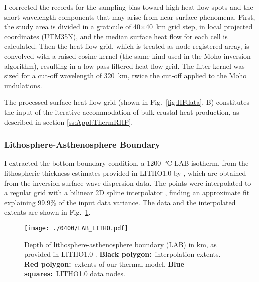 I corrected the records for the sampling bias toward high heat flow spots \parencite{Mareschal2013} and the short-wavelength components that may arise from near-surface phenomena.
First, the study area is divided in a graticule of \num{40}$\times$\SI{40}{\kilo \metre} grid step, in local projected coordinates (UTM35N), and the median surface heat flow for each cell is calculated.
Then the heat flow grid, which is treated as node-registered array, is convolved with a raised cosine kernel (the same kind used in the Moho inversion algorithm), resulting in a low-pass filtered heat flow grid.
The filter kernel was sized for a cut-off wavelength of \SI{320}{\kilo \metre}, twice the cut-off applied to the Moho undulations.

The processed surface heat flow grid (shown in Fig.~\ref{fig:HFdata}, B) constitutes the input of the iterative accommodation of bulk crustal heat production, as described in section \ref{ss:Appl:ThermRHP}.

\subsubsection{Lithosphere-Asthenosphere Boundary}
\label{sss:Appl:ThermInputLAB}

I extracted the bottom boundary condition, a \SI{1200}{\celsius} LAB-isotherm, from the lithospheric thickness estimates provided in LITHO1.0 by \textcite{Pasyanos2014}, which are obtained from the inversion surface wave dispersion data.
The points were interpolated to a regular grid with a bilinear 2D spline interpolator \parencite{Wessel2009}, finding an approximate fit explaining 99.9\% of the input data variance.
The data and the interpolated extents are shown in Fig.~\ref{fig:LAB}.

\begin{figure}
	\begin{adjustbox}{center}
	\texttt{[image: ./0400/LAB\_LITHO.pdf]}
	\end{adjustbox}
	\caption[Depth of lithosphere-asthenosphere boundary (LAB), as provided in LITHO1.0.]{Depth of lithosphere-asthenosphere boundary (LAB) in km, as provided in LITHO1.0 \parencite{Pasyanos2014}. \textbf{Black polygon:}~interpolation extents. \textbf{Red polygon:}~extents of our thermal model. \textbf{Blue squares:}~LITHO1.0 data nodes.}
	\label{fig:LAB}
\end{figure}

